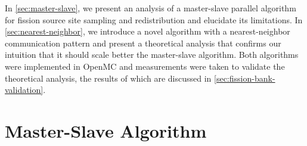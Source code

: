 In \autoref{sec:master-slave}, we present an analysis of a master-slave parallel
algorithm for fission source site sampling and redistribution and elucidate its
limitations. In \autoref{sec:nearest-neighbor}, we introduce a novel algorithm
with a nearest-neighbor communication pattern and present a theoretical analysis
that confirms our intuition that it should scale better the master-slave
algorithm. Both algorithms were implemented in OpenMC and measurements were
taken to validate the theoretical analysis, the results of which are discussed
in \autoref{sec:fission-bank-validation}.


\section{Master-Slave Algorithm}
\label{sec:master-slave}

